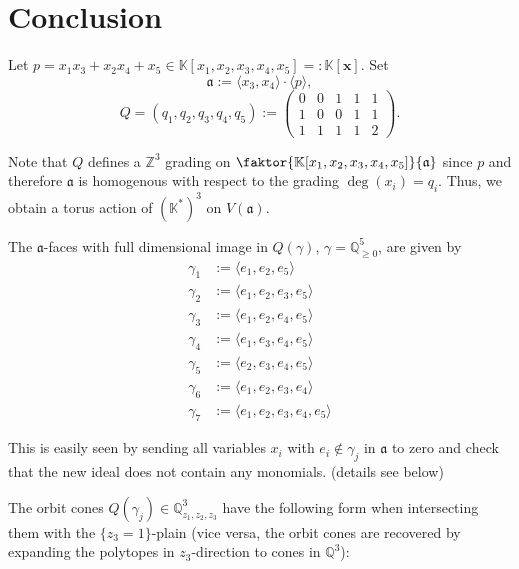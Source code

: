 \chapter{Conclusion}
Let $p = x_1x_3+x_2x_4+x_5\in \mathbb{K}[x_1,x_2,x_3,x_4,x_5] =: \mathbb{K}[\mathbf{x}]$. Set 
$$\mathfrak{a} := \langle x_3, x_4\rangle \cdot \langle p\rangle,$$
$$Q = (q_1, q_2, q_3, q_4, q_5) := \begin{pmatrix}
0 & 0 & 1 & 1 & 1 \\
1 & 0 & 0 & 1 & 1 \\
1 & 1 & 1 & 1 & 2 
\end{pmatrix}.$$

Note that $Q$ defines a $\mathbb{Z}^3$ grading on $\faktor{\mathbb{K}[x_1,x_2,x_3,x_4,x_5]}{\mathfrak{a}}$ since $p$ and therefore $\mathfrak{a}$ is homogenous with respect to the grading $\deg(x_i) = q_i$. Thus, we obtain a torus action of $(\mathbb{K}^*)^3$ on $V(\mathfrak{a})$.

The $\mathfrak{a}$-faces with full dimensional image in $Q(\gamma)$, $\gamma = \mathbb{Q}^5_{\geq 0}$, are given by
\begin{align*}
\gamma_1 &:=\langle e_1, e_2, e_5\rangle \\
\gamma_2 &:=\langle e_1, e_2, e_3, e_5\rangle \\
\gamma_3 &:=\langle e_1, e_2, e_4, e_5\rangle \\
\gamma_4 &:=\langle e_1, e_3, e_4, e_5\rangle \\
\gamma_5 &:=\langle e_2, e_3, e_4, e_5\rangle \\
\gamma_6 &:=\langle e_1, e_2, e_3, e_4\rangle \\
\gamma_7 &:=\langle e_1, e_2, e_3, e_4, e_5\rangle
\end{align*}

This is easily seen by sending all variables $x_i$ with $e_i\notin \gamma_j$ in $\mathfrak{a}$ to zero and check that the new ideal does not contain any monomials. (details see below)

The orbit cones $Q(\gamma_j)\in \mathbb{Q}^3_{z_1,z_2,z_3}$ have the following form when intersecting them with the $\{z_3 = 1\}$-plain (vice versa, the orbit cones are recovered by expanding the polytopes in $z_3$-direction to cones in $\mathbb{Q}^3$):

